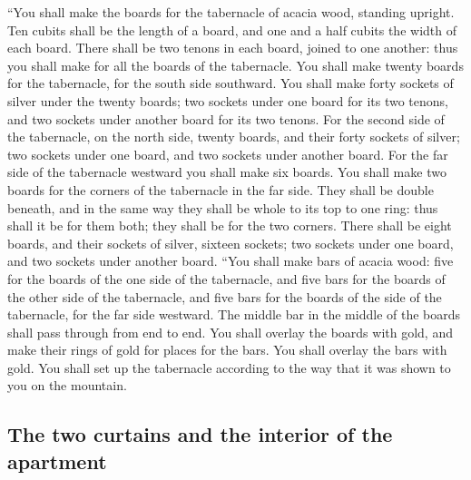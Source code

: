  ``You shall make the boards for the tabernacle of acacia
wood, standing upright.  Ten cubits shall be the length
of a board, and one and a half cubits the width of each board.
 There shall be two tenons in each board, joined to one
another: thus you shall make for all the boards of the tabernacle.
 You shall make twenty boards for the tabernacle, for the
south side southward.  You shall make forty sockets of
silver under the twenty boards; two sockets under one board for its two
tenons, and two sockets under another board for its two tenons.
 For the second side of the tabernacle, on the north
side, twenty boards,  and their forty sockets of silver;
two sockets under one board, and two sockets under another board.
 For the far side of the tabernacle westward you shall
make six boards.  You shall make two boards for the
corners of the tabernacle in the far side.  They shall be
double beneath, and in the same way they shall be whole to its top to
one ring: thus shall it be for them both; they shall be for the two
corners.  There shall be eight boards, and their sockets
of silver, sixteen sockets; two sockets under one board, and two sockets
under another board.  ``You shall make bars of acacia
wood: five for the boards of the one side of the tabernacle,
 and five bars for the boards of the other side of the
tabernacle, and five bars for the boards of the side of the tabernacle,
for the far side westward.  The middle bar in the middle
of the boards shall pass through from end to end.  You
shall overlay the boards with gold, and make their rings of gold for
places for the bars. You shall overlay the bars with gold.
 You shall set up the tabernacle according to the way
that it was shown to you on the mountain.

\hypertarget{the-two-curtains-and-the-interior-of-the-apartment}{%
\subsection{The two curtains and the interior of the
apartment}\label{the-two-curtains-and-the-interior-of-the-apartment}}

